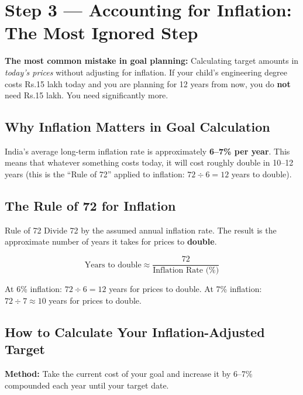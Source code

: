 \documentclass[12pt,a4paper]{article}
\makeatletter
\newcommand{\rupee}{\ifmmode\text{Rs.}\else Rs.\@\fi}
\makeatother
\begin{document}
\section{Step 3 --- Accounting for Inflation: The Most Ignored Step}

\begin{warningbox}
\textbf{The most common mistake in goal planning:} Calculating target amounts in \textit{today's prices} without adjusting for inflation. If your child's engineering degree costs \rupee{}15 lakh today and you are planning for 12 years from now, you do \textbf{not} need \rupee{}15 lakh. You need significantly more.
\end{warningbox}

\subsection{Why Inflation Matters in Goal Calculation}

India's average long-term inflation rate is approximately \textbf{6--7\% per year}. This means that whatever something costs today, it will cost roughly double in 10--12 years (this is the ``Rule of 72'' applied to inflation: $72 \div 6 = 12$ years to double).

\subsection{The Rule of 72 for Inflation}

\begin{definitionbox}{Rule of 72}
Divide 72 by the assumed annual inflation rate. The result is the approximate number of years it takes for prices to \textbf{double}.

$$\text{Years to double} \approx \frac{72}{\text{Inflation Rate (\%)}}$$

At 6\% inflation: $72 \div 6 = 12$ years for prices to double.
At 7\% inflation: $72 \div 7 \approx 10$ years for prices to double.
\end{definitionbox}

\subsection{How to Calculate Your Inflation-Adjusted Target}

\textbf{Method:} Take the current cost of your goal and increase it by 6--7\% compounded each year until your target date.
\end{document}
